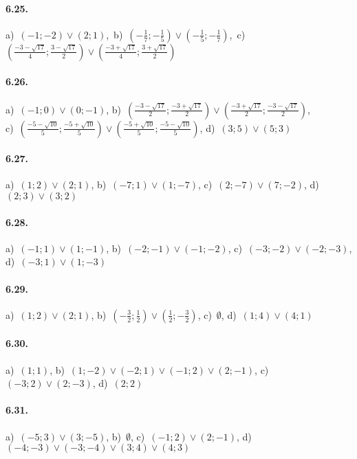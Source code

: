 \paragraph{6.25.} 
a)~\( (-1; -2)\vee(2;1) \),\, 
b)~\(\left(-\frac 1 7;-\frac 1 5\right)\vee\left(-\frac 1 5;-\frac 1 
7\right)\),\, 
c)~\(\left(\frac{-3-\sqrt{17}} 4;{\frac{3-\sqrt{17}} 
2}\right)\vee \left(\frac{-3+\sqrt{17}} 4;{\frac{3+\sqrt{17}} 2}\right)\)

\paragraph{6.26.} 
a)~\((-1;0)\vee(0;-1)\),\quad 
b)~\(\left(\frac{-3-\sqrt{17}} 
2;\frac{-3+\sqrt{17}} 2\right)\vee\left(\frac{-3+\sqrt{17}} 
2;\frac{-3-\sqrt{17}} 2\right)\),\quad \protect\\
c)~\(\left(\frac{-5-\sqrt{10}} 5;\frac{-5+\sqrt{10}} 5\right)\vee 
\left(\frac{-5+\sqrt{10}} 5;\frac{-5-\sqrt{10}} 5\right)\),\quad 
d)~\((3;5)\vee(5;3)\)

\paragraph{6.27.} 
a)~\((1;2)\vee(2;1)\),\quad 
b)~\((-7;1)\vee(1;-7)\),\quad 
c)~\((2;-7)\vee(7;-2)\),\quad 
d)~\((2;3)\vee(3;2)\)

\paragraph{6.28.} 
a)~\((-1;1)\vee(1;-1)\),\;
b)~\((-2;-1)\vee(-1;-2)\),\; 
c)~\((-3;-2)\vee(-2;-3)\),\; 
d)~\((-3;1)\vee(1;-3)\)

\paragraph{6.29.} 
a)~\((1;2)\vee(2;1)\),\quad 
b)~\(\left(-\frac 3 2;\frac 1 2\right)\vee\left(\frac 1 2;-\frac 3 
2\right)\),\quad 
c)~\(\emptyset\),\quad 
d)~\((1;4)\vee(4;1)\)

\paragraph{6.30.} 
a)~\((1;1)\),\quad 
b)~\((1;-2)\vee(-2;1)\vee(-1;2)\vee(2;-1)\),\quad 
c)~\((-3;2)\vee(2;-3)\),\quad 
d)~\((2;2)\)

\paragraph{6.31.} 
a)~\((-5;3)\vee(3;-5)\),\quad 
b)~\(\emptyset\),\quad 
c)~\((-1;2)\vee(2;-1)\),\quad 
d)~\((-4;-3)\vee(-3;-4)\vee(3;4)\vee(4;3)\)


